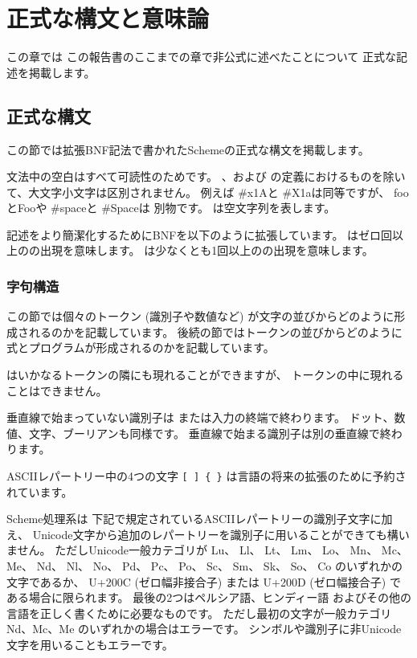 \chapter{正式な構文と意味論}
\label{formalchapter}

この章では
この報告書のここまでの章で非公式に述べたことについて
正式な記述を掲載します。



\section{正式な構文}
\label{BNF}

この節では拡張BNF記法で書かれたSchemeの正式な構文を掲載します。

文法中の空白はすべて可読性のためです。
、および
の定義におけるものを除いて、大文字小文字は区別されません。
例えば {\cf \#x1A}と {\cf \#X1a}は同等ですが、
{\cf foo}と{\cf Foo}や %
{\cf \#\backwhack{}space}と {\cf \#\backwhack{}Space}は
別物です。
は空文字列を表します。

記述をより簡潔化するためにBNFを以下のように拡張しています。
はゼロ回以上のの出現を意味します。
は少なくとも1回以上のの出現を意味します。


\subsection{字句構造}

この節では個々のトークン (識別子や数値など)
が文字の並びからどのように形成されるのかを記載しています。
後続の節ではトークンの並びからどのように式とプログラムが形成されるのかを記載しています。

はいかなるトークンの隣にも現れることができますが、
トークンの中に現れることはできません。

\vest 垂直線で始まっていない識別子は
または入力の終端で終わります。
ドット、数値、文字、ブーリアンも同様です。
垂直線で始まる識別子は別の垂直線で終わります。

ASCIIレパートリー中の4つの文字
{\tt \verb"[" \verb"]" \verb"{" \verb"}"}
は言語の将来の拡張のために予約されています。

Scheme処理系は
下記で規定されているASCIIレパートリーの識別子文字に加え、
Unicode文字から追加のレパートリーを識別子に用いることができても構いません。
ただしUnicode一般カテゴリが
Lu、 Ll、 Lt、 Lm、 Lo、 Mn、 Mc、 Me、 Nd、 Nl、 No、 Pd、 Pc、 Po、 Sc、 Sm、 Sk、 So、 Co
のいずれかの文字であるか、
U+200C (ゼロ幅非接合子) または U+200D (ゼロ幅接合子)
である場合に限られます。
最後の2つはペルシア語、ヒンディー語
およびその他の言語を正しく書くために必要なものです。
ただし最初の文字が一般カテゴリ Nd、Mc、Me のいずれかの場合はエラーです。
シンボルや識別子に非Unicode文字を用いることもエラーです。

